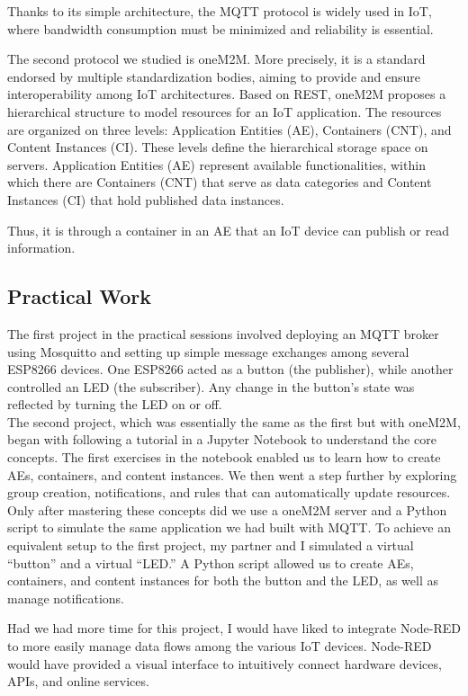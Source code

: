 Thanks to its simple architecture, the MQTT protocol is widely used in IoT, where bandwidth consumption must be minimized and reliability is essential.

The second protocol we studied is oneM2M. More precisely, it is a standard endorsed by multiple standardization bodies, aiming to provide and ensure interoperability among IoT architectures. Based on REST, oneM2M proposes a hierarchical structure to model resources for an IoT application. The resources are organized on three levels: Application Entities (AE), Containers (CNT), and Content Instances (CI). These levels define the hierarchical storage space on servers. Application Entities (AE) represent available functionalities, within which there are Containers (CNT) that serve as data categories and Content Instances (CI) that hold published data instances.

Thus, it is through a container in an AE that an IoT device can publish or read information.

\subsection{Practical Work}
The first project in the practical sessions involved deploying an MQTT broker using Mosquitto and setting up simple message exchanges among several ESP8266 devices. One ESP8266 acted as a button (the publisher), while another controlled an LED (the subscriber). Any change in the button’s state was reflected by turning the LED on or off.\\

The second project, which was essentially the same as the first but with oneM2M, began with following a tutorial in a Jupyter Notebook to understand the core concepts. The first exercises in the notebook enabled us to learn how to create AEs, containers, and content instances. We then went a step further by exploring group creation, notifications, and rules that can automatically update resources.\\

Only after mastering these concepts did we use a oneM2M server and a Python script to simulate the same application we had built with MQTT. To achieve an equivalent setup to the first project, my partner and I simulated a virtual “button” and a virtual “LED.” A Python script allowed us to create AEs, containers, and content instances for both the button and the LED, as well as manage notifications. 

Had we had more time for this project, I would have liked to integrate Node-RED to more easily manage data flows among the various IoT devices. Node-RED would have provided a visual interface to intuitively connect hardware devices, APIs, and online services.

